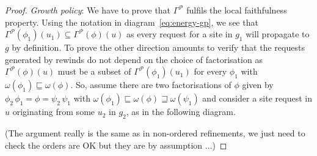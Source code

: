 \documentclass[a4paper,12pt]{article}
\newcommand{\diagram}[1]{diagram~\ref{eq:#1}}
\newcommand{\anon}[1]{\left|#1\right|}
\newcommand{\gp}{\Gamma}
\newcommand{\shapes}{\mathcal{P}}
\begin{document}
\begin{proof}
  \emph{Growth policy}:
  We have to prove that
  $\gp^\shapes$ fulfils the local faithfulness property.
  Using the notation in \diagram{energy-gp},
  we see that $\gp^\shapes(\phi_1)(u_1) \subseteq \gp^\shapes(\phi)(u)$
  as every request for a site in $g_1$ will propagate to $g$
  by definition.
  To prove the other direction
  amounts to verify that the requests generated by rewinds
  do not depend on the choice of factorisation
  as $\gp^\shapes(\phi)(u)$ must be a subset of
  $\gp^\shapes(\phi_1)(u_1)$ for every $\phi_1$
  with $\omega(\phi_1) \sqsubseteq \omega(\phi)$.
  So, assume there are two factorisations of $\phi$
  given by $\phi_2\,\phi_1 = \phi = \psi_2\,\psi_1$
  with $\omega(\phi_1) \sqsubseteq \omega(\phi)
  \sqsupseteq \omega(\psi_1)$
  and consider a site request in $u$
  originating from some $u_2$ in $g_2$,
  as in the following diagram.
  \begin{center}
  \end{center}
  (The argument really is the same as in non-ordered refinements,
  we just need to check the orders are OK
  but they are by assumption ...)
\end{proof}
\end{document}
